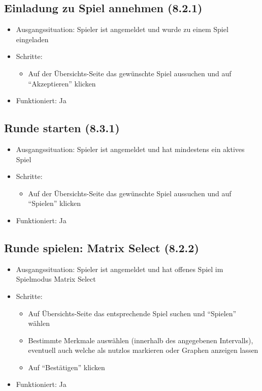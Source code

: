 \documentclass[a4paper]{scrreprt}
\begin{document}
            \subsection{Einladung zu Spiel annehmen (8.2.1)}
            \begin{itemize}
                \item Ausgangssituation: Spieler ist angemeldet und wurde zu einem Spiel eingeladen
                \item Schritte:
                    \begin{itemize}
                        \item Auf der Übersichts-Seite das gewünschte Spiel aussuchen und auf \enquote{Akzeptieren} klicken
                    \end{itemize}
                \item Funktioniert: Ja
            \end{itemize}

            \subsection{Runde starten (8.3.1)}
            \begin{itemize}
                \item Ausgangssituation: Spieler ist angemeldet und hat mindestens ein aktives Spiel
                \item Schritte:
                    \begin{itemize}
                        \item Auf der Übersichts-Seite das gewünschte Spiel aussuchen und auf \enquote{Spielen} klicken
                    \end{itemize}
                \item Funktioniert: Ja
            \end{itemize}

            \subsection{Runde spielen: Matrix Select (8.2.2)}
            \begin{itemize}
                \item Ausgangssituation: Spieler ist angemeldet und hat offenes Spiel im Spielmodus Matrix Select
                \item Schritte:
                    \begin{itemize}
                        \item Auf Übersichts-Seite das entsprechende Spiel suchen und \enquote{Spielen} wählen
                        \item Bestimmte Merkmale auswählen (innerhalb des angegebenen Intervalls), eventuell auch welche als nutzlos markieren oder Graphen anzeigen lassen
                        \item Auf \enquote{Bestätigen} klicken
                    \end{itemize}
                \item Funktioniert: Ja
            \end{itemize}
\end{document}

